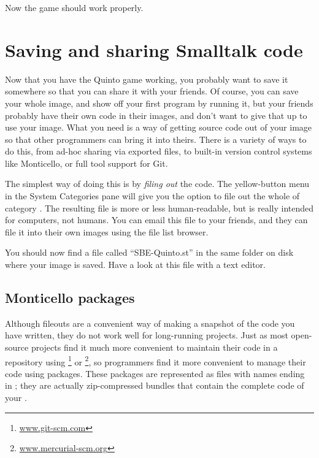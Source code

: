 \documentclass[a4paper,10pt,twoside]{book}
\begin{document}
Now the game should work properly.

\section{Saving and sharing Smalltalk code}
\label{sec:Monticello}

Now that you have the Quinto game working, you probably want to save it somewhere so that you can share it with your friends.
Of course, you can save your whole \squeak image, and show off your first program by running it, but your friends probably have their own code in their images, and don't want to give that up to use your image.
What you need is a way of getting source code out of your \squeak image so that other programmers can bring it into theirs.
There is a variety of ways to do this, from ad-hoc sharing via exported files, to built-in version control systems like Monticello, or full tool support for Git.

The simplest way of doing this is by \emph{filing out} the code.
The yellow-button menu in the System Categories pane will give you the option to file out the whole of category .
The resulting file is more or less human-readable, but is really intended for computers, not humans.
You can email this file to your friends, and they can file it into their own \squeak images using the file list browser.

You should now find a file called ``SBE-Quinto.st'' in the same folder on disk where your image is saved.
Have a look at this file with a text editor.


\subsection{Monticello packages}
Although fileouts are a convenient way of making a snapshot of the code you have written, they do not work well for long-running projects.
Just as most open-source projects find it much more convenient to maintain their code in a repository using \footnote{\url{www.git-scm.com}} or \footnote{\url{www.mercurial-scm.org}}, so \squeak programmers find it more convenient to manage their code using  packages. 
These packages are represented as files with names ending in ; they are actually zip-compressed bundles that contain the complete code of your .
\end{document}
